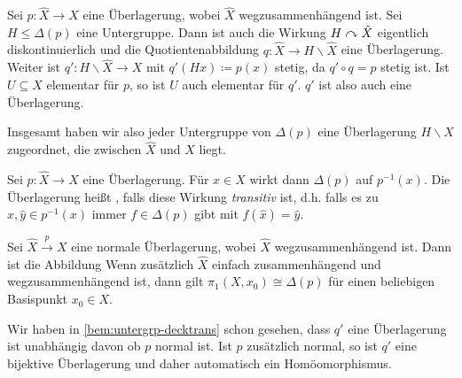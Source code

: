 \noindent\begin{minipage}{.82\textwidth}
	\begin{bemerkung}[{name=[Untergruppen der Decktransformationsgruppe]},label=bem:untergrp-decktrans]
		Sei $p \colon \hat{X} \to X$ eine Überlagerung, wobei $\hat{X}$ wegzusammenhängend ist. 
		Sei $H \le \Delta(p)$ eine Untergruppe. Dann ist auch die Wirkung $H \mathrel{\curvearrowright} \hat{X}$ eigentlich diskontinuierlich und die Quotientenabbildung $q \colon \hat{X} \to H \backslash \hat{X}$ eine Überlagerung. 
		Weiter ist $q' \colon H \backslash \hat{X} \to X$ mit $q'(Hx) \coloneqq p(x)$ stetig, da $q' \circ q = p$ stetig ist. 
		Ist $U \subseteq X$ elementar für $p$, so ist $U$ auch elementar für $q'$. 
		$q'$ ist also auch eine Überlagerung.
	
		Insgesamt haben wir also jeder Untergruppe von $\Delta (p)$ eine Überlagerung $H \backslash \hat{X}$ zugeordnet, die zwischen $\hat{X}$ und $X$ liegt.
	\end{bemerkung}
\end{minipage}%
\begin{minipage}{.17\textwidth}
	\hfill{}
\end{minipage}

\begin{definition}[{name=[normale Überlagerung]}]
	Sei $p \colon \hat{X} \to X$ eine Überlagerung. 
	Für $x \in X$ wirkt dann $\Delta(p)$ auf $p^{-1}(x)$. 
	Die Überlagerung heißt , falls diese Wirkung \emph{transitiv} ist, d.h. falls es zu $\hat{x}, \hat{y} \in p^{-1}(x)$ immer $f \in \Delta(p)$ gibt mit $f(\hat{x})= \hat{y}$.
\end{definition}

\begin{proposition}[{name=[Homöomorphismus für normale Überlagerungen]}]
	Sei $\hat{X} \xrightarrow{p} X $ eine normale Überlagerung, wobei $\hat{X}$ wegzusammenhängend ist. Dann ist die Abbildung
	Wenn zusätzlich $\hat{X}$ einfach zusammenhängend und wegzusammenhängend ist, dann gilt $\pi_1(X, x_0) \cong \Delta(p)$ für einen beliebigen Basispunkt $x_0 \in X$.
\end{proposition}
\begin{beweis}
	Wir haben in \cref{bem:untergrp-decktrans} schon gesehen, dass $q'$ eine Überlagerung ist unabhängig davon ob $p$ normal ist. Ist $p$ zusätzlich normal, so ist $q'$ eine bijektive Überlagerung und daher automatisch ein Homöomorphismus.
\end{beweis}

